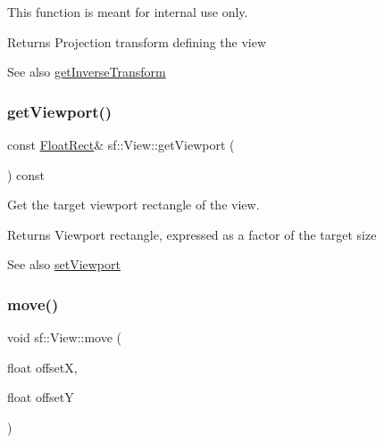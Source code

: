 This function is meant for internal use only.

\begin{DoxyReturn}{Returns}
Projection transform defining the view
\end{DoxyReturn}
\begin{DoxySeeAlso}{See also}
\hyperlink{classsf_1_1_view_acd2b001cf2a646f62e7d9e792d7d5f0d}{get\+Inverse\+Transform} 
\end{DoxySeeAlso}
\mbox{\label{classsf_1_1_view_a93859b4e2e8c191ec741731211a0fb12}} 
\subsubsection{\texorpdfstring{get\+Viewport()}{getViewport()}}
{\footnotesize\ttfamily const \hyperlink{classsf_1_1_rect}{Float\+Rect}\& sf\+::\+View\+::get\+Viewport (\begin{DoxyParamCaption}{ }\end{DoxyParamCaption}) const}



Get the target viewport rectangle of the view. 

\begin{DoxyReturn}{Returns}
Viewport rectangle, expressed as a factor of the target size
\end{DoxyReturn}
\begin{DoxySeeAlso}{See also}
\hyperlink{classsf_1_1_view_a8eaec46b7d332fe834f016d0187d4b4a}{set\+Viewport} 
\end{DoxySeeAlso}
\mbox{\label{classsf_1_1_view_a0c82144b837caf812f7cb25a43d80c41}} 
\subsubsection{\texorpdfstring{move()}{move()}\hspace{0.1cm}{\footnotesize\ttfamily [1/2]}}
{\footnotesize\ttfamily void sf\+::\+View\+::move (\begin{DoxyParamCaption}\item[{float}]{offsetX,  }\item[{float}]{offsetY }\end{DoxyParamCaption})}



